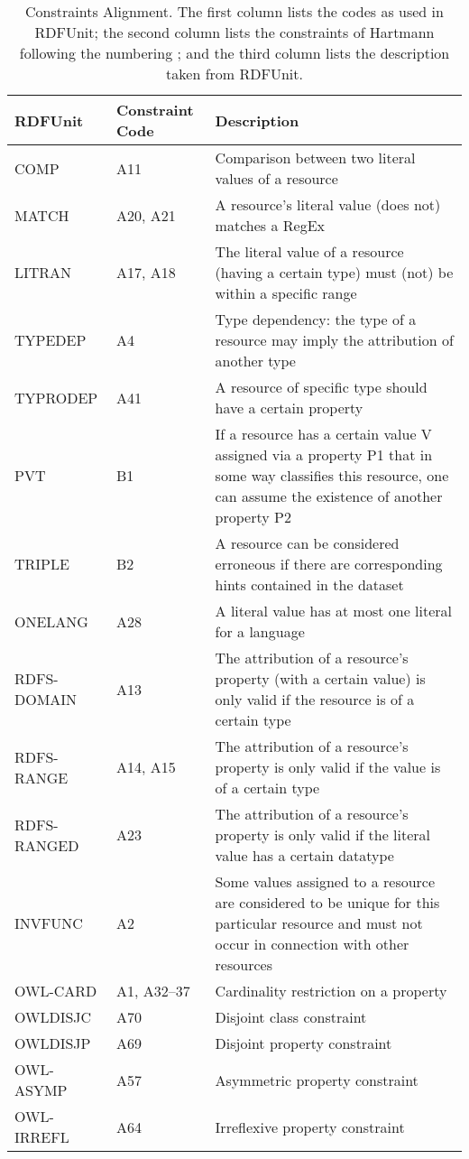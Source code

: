 \begin{table}
\caption{Constraints Alignment.
The first column lists the codes as used in RDFUnit;
the second column lists the constraints of Hartmann  following the numbering \cite[appendix]{hartmann2016}; and
the third column lists the description taken from RDFUnit.
}
\label{table:align}
\begin{tabular}{ p{} p{} p{}  } \toprule
\textbf{RDFUnit} & \textbf{Constraint Code} & \textbf{Description} \\ \midrule
COMP & A11  &Comparison between two literal values of a resource\\ \midrule
MATCH & A20, A21 &A resource's literal value (does not) matches a RegEx\\ \midrule
LITRAN & A17, A18 &The literal value of a resource (having a certain type) must (not) be within a specific range\\ \midrule %
TYPEDEP & A4 &Type dependency:  the type of a resource may imply the attribution of another type\\ \midrule %
TYPRODEP & A41 &A resource of specific type should have a certain property\\ \midrule %
PVT & B1 &If a resource has a certain value V assigned via a property P1 that in some way classifies this resource, one can assume the existence of another property P2\\ \midrule %
TRIPLE & B2 &
A resource can be considered erroneous if
there are corresponding hints contained in
the dataset\\ \midrule %
ONELANG & A28 &A literal value has at most one literal for a language\\ \midrule %
RDFS-DOMAIN & A13 &The attribution of a resource's property
(with a certain value) is only valid if the
resource is of a certain type\\ \midrule %
RDFS-RANGE & A14, A15 & The attribution of a resource's property is
only valid if the value is of a certain type\\ \midrule %
RDFS-RANGED & A23 &
The attribution of a resource's property is
only valid if the literal value has a certain
datatype\\ \midrule %
INVFUNC & A2 & Some values assigned to a resource are
considered to be unique for this particular
resource and must not occur in
connection with other resources\\ \midrule %
OWL-CARD & A1, A32--37 & Cardinality restriction on a property\\ \midrule %
OWLDISJC & A70 & Disjoint class constraint\\ \midrule %
OWLDISJP & A69 & Disjoint property constraint\\ \midrule %
OWL-ASYMP & A57 & Asymmetric property constraint\\ \midrule %
OWL-IRREFL & A64 & Irreflexive property constraint \\ \bottomrule
\end{tabular}
\end{table}



